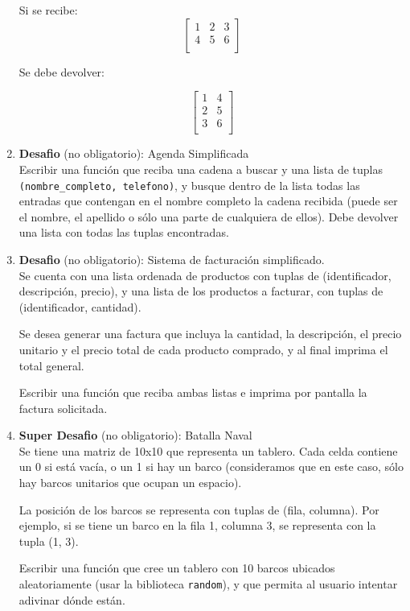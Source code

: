 \documentclass[
  letterpaper,
  DIV=11,
  numbers=noendperiod]{scrreprt}
\begin{document}
\begin{enumerate}
  Si se recibe: \[
  \begin{bmatrix}
  1 & 2 & 3  \\
  4 & 5 & 6  \\
  \end{bmatrix}
  \]

  Se debe devolver:

  \[
  \begin{bmatrix}
  1 & 4 \\
  2 & 5 \\
  3 & 6 \\
  \end{bmatrix}
  \]
\item
  \textbf{Desafio} (no obligatorio): Agenda Simplificada\\
  Escribir una función que reciba una cadena a buscar y una lista de
  tuplas \texttt{(nombre\_completo,\ telefono)}, y busque dentro de la
  lista todas las entradas que contengan en el nombre completo la cadena
  recibida (puede ser el nombre, el apellido o sólo una parte de
  cualquiera de ellos). Debe devolver una lista con todas las tuplas
  encontradas.
\item
  \textbf{Desafio} (no obligatorio): Sistema de facturación
  simplificado.\\
  Se cuenta con una lista ordenada de productos con tuplas de
  (identificador, descripción, precio), y una lista de los productos a
  facturar, con tuplas de (identificador, cantidad).

  Se desea generar una factura que incluya la cantidad, la descripción,
  el precio unitario y el precio total de cada producto comprado, y al
  final imprima el total general.

  Escribir una función que reciba ambas listas e imprima por pantalla la
  factura solicitada.
\item
  \textbf{Super Desafio} (no obligatorio): Batalla Naval\\

  Se tiene una matriz de 10x10 que representa un tablero. Cada celda
  contiene un 0 si está vacía, o un 1 si hay un barco (consideramos que
  en este caso, sólo hay barcos unitarios que ocupan un espacio).

  La posición de los barcos se representa con tuplas de (fila, columna).
  Por ejemplo, si se tiene un barco en la fila 1, columna 3, se
  representa con la tupla (1, 3).

  Escribir una función que cree un tablero con 10 barcos ubicados
  aleatoriamente (usar la biblioteca \texttt{random}), y que permita al
  usuario intentar adivinar dónde están.


\end{enumerate}
\end{document}
